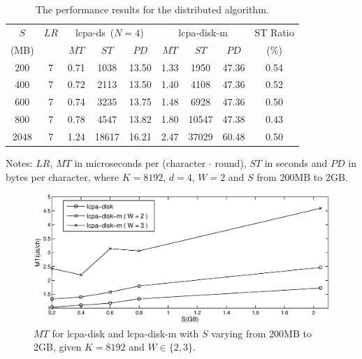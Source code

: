 \documentclass{llncs}
\begin{document}
\begin{table}[htbp!]
	\begin{threeparttable}
		\caption{The performance results for the distributed algorithm.}
		\label{tbl:diskm_vs_ds}
		\centering
		\begin{tabular}{|c|c|c|c|c|c|c|c|c|}
			\hline
			$S$ & $LR$ & \multicolumn{3}{c|}{lcpa-ds~($N=4$)} & \multicolumn{3}{c|}{lcpa-disk-m} & ST Ratio\\
			\cline{3-8}
			(MB) & & $MT$ & $ST$ & $PD$ & $MT$ & $ST$ & $PD$ & (\%)\\
			\hline
			200 & 7 & 0.71 & 1038 & 13.50 & 1.33 & 1950 & 47.36 & 0.54 \\
			\hline
			400 & 7 & 0.72 & 2113 & 13.50 & 1.40 & 4108 & 47.36 & 0.52 \\
			\hline
			600 & 7 & 0.74 & 3235 & 13.75 & 1.48 & 6928 & 47.36 & 0.50 \\
			\hline
			800 & 7 & 0.78 & 4547 & 13.82 & 1.80 & 10547 & 47.38 & 0.43 \\
			\hline
			2048 & 7 & 1.24 & 18617 & 16.21 & 2.47 & 37029 & 60.48 & 0.50 \\
			\hline
		\end{tabular}
		\begin{tablenotes}
			\item Notes: $LR$, $MT$ in microseconds per (character $\cdot$ round), $ST$ in seconds and $PD$ in bytes per character, where $K=8192$, $d=4$, $W=2$ and $S$ from 200MB to 2GB.
		\end{tablenotes}
	\end{threeparttable}
	\centering
\end{table}

\begin{figure}[t]
\centering
\includegraphics[width=1\textwidth]{disk_vs_diskm.eps}
\caption{$MT$ for lcpa-disk and lcpa-disk-m with $S$ varying from 200MB to 2GB, given $K=8192$ and $W\in \{2,3\}$.}
\label{fig:disk_vs_diskm}
\end{figure}
\end{document}
